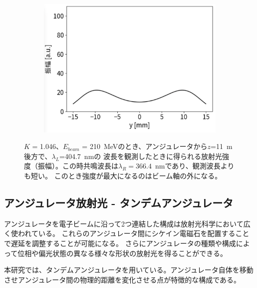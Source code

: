 \documentclass[a4paper,11pt,uplatex]{jsbook}
\begin{document}
\begin{figure}[H]
\begin{subfigure}[h]{0.35\linewidth}
    \centering
    \includegraphics[width=\linewidth]{image/2-spe_nores_y.png}
  \end{subfigure}
\caption[非共鳴波長でのアンジュレータ放射]{$K$ = 1.046、$E_{beam}$ = 210~MeVのとき、アンジュレータから$z$=11~m後方で、$\lambda_L$=404.7~nmの
波長を観測したときに得られる放射光強度（振幅）。この時共鳴波長は$\lambda_R = 366.4$~nmであり、観測波長よりも短い。
このとき強度が最大になるのはビーム軸の外になる。}\label{fig:noresonance}
\end{figure}

\subsection{アンジュレータ放射光 - タンデムアンジュレータ}\label{sec:tandem}
アンジュレータを電子ビームに沿って2つ連結した構成は放射光科学において広く使われている。
これらのアンジュレータ間にシケイン電磁石を配置することで遅延を調整することが可能になる。
さらにアンジュレータの種類や構成によって位相や偏光状態の異なる様々な形状の放射光を得ることができる\cite{kaneyasu}。

本研究では、タンデムアンジュレータを用いている。アンジュレータ自体を移動させアンジュレータ間の物理的距離を変化させる点が特徴的な構成である。
\end{document}
